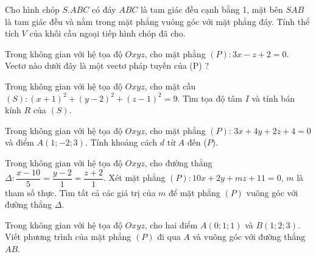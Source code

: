 \begin{vnmultiplechoice}[ rearrange=yes, keycolumns=5]
\begin{question} %
Cho hình chóp $S.ABC$ có đáy $ABC$ là tam giác đều cạnh bằng 1, mặt bên $SAB$ là
tam giác đều và nằm trong mặt phẳng vuông góc với mặt phẳng đáy. Tính thể tích $V$ của
khối cầu ngoại tiếp hình chóp đã cho.
\datcot
\bonpa
{}
{}
{}
{}
\end{question}

\begin{question} %
Trong không gian với hệ tọa độ $Oxyz$, cho mặt phẳng $(P) : 3x - z + 2 = 0$. Vectơ
nào dưới đây là một vectơ pháp tuyến của (P) ?
\datcot
\bonpa
{}
{}
{}
{}
\end{question}

\begin{question} %
Trong không gian với hệ tọa độ $Oxyz$, cho mặt cầu
$(S):(x+1)^2+(y-2)^2+(z-1)^2=9.$
Tìm tọa độ tâm $I$ và tính bán kính $R$ của $(S)$.
\datcot[2]
\bonpa
{}
{}
{}
{}
\end{question}


\begin{question} %
Trong không gian với hệ tọa độ $Oxyz$, cho mặt phẳng $(P) $:  
$3x+4y+2z+4=0$
và điểm $A(1; -2; 3).$ Tính khoảng cách $d$ từ $A$ đến ($P$).
\datcot
\bonpa
{}
{}
{}
{}
\end{question}

\begin{question} %
Trong không gian với hệ tọa độ $Oxyz$, cho đường thẳng $\Delta :
\dfrac{x-10}{5}=\dfrac{y-2}{1}=\dfrac{z+2}{1}.$
Xét mặt phẳng $(P) : 10x + 2y + mz + 11 = 0$, $m$ là tham số thực. Tìm tất cả các giá trị của
$m$ để mặt phẳng $(P)$ vuông góc với đường thẳng $\Delta$.
\datcot
\bonpa
{}
{}
{}
{}
\end{question}

\begin{question} %
Trong không gian với hệ tọa độ $Oxyz$, cho hai điểm $A(0; 1; 1)$ và $B(1; 2; 3)$.
Viết phương trình của mặt phẳng $(P)$ đi qua $A$ và vuông góc với đường thẳng $AB$.
\datcot[2]
\bonpa
{}
{}
{}
{}
\end{question}


\end{vnmultiplechoice}
